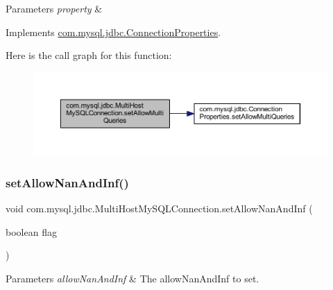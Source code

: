\begin{DoxyParams}{Parameters}
{\em property} & \\
\hline
\end{DoxyParams}


Implements \mbox{\hyperlink{interfacecom_1_1mysql_1_1jdbc_1_1_connection_properties_ac1ed5c3bc5f7f6c977f499b6560ef5a4}{com.\+mysql.\+jdbc.\+Connection\+Properties}}.

Here is the call graph for this function\+:
\nopagebreak
\begin{figure}[H]
\begin{center}
\leavevmode
\includegraphics[width=350pt]{classcom_1_1mysql_1_1jdbc_1_1_multi_host_my_s_q_l_connection_a0a2fefd00cc98baf06444ff815a8066d_cgraph}
\end{center}
\end{figure}
\mbox{\label{classcom_1_1mysql_1_1jdbc_1_1_multi_host_my_s_q_l_connection_a301b4bf7a1c4e8bdbf15cc7a977cd0b8}} 
\subsubsection{\texorpdfstring{set\+Allow\+Nan\+And\+Inf()}{setAllowNanAndInf()}}
{\footnotesize\ttfamily void com.\+mysql.\+jdbc.\+Multi\+Host\+My\+S\+Q\+L\+Connection.\+set\+Allow\+Nan\+And\+Inf (\begin{DoxyParamCaption}\item[{boolean}]{flag }\end{DoxyParamCaption})}


\begin{DoxyParams}{Parameters}
{\em allow\+Nan\+And\+Inf} & The allow\+Nan\+And\+Inf to set. \\
\hline
\end{DoxyParams}


